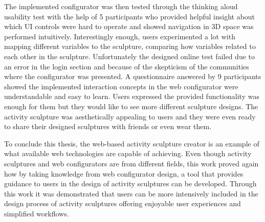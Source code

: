\documentclass[../medieninformatik-arbeit.tex]{subfiles}
\begin{document}
The implemented configurator was then tested through the thinking aloud usability test with the help of 5 participants who provided helpful insight about which UI controls were hard to operate and showed navigation in 3D space was performed intuitively. Interestingly enough, users experimented a lot with mapping different variables to the sculpture, comparing how variables related to each other in the sculpture. Unfortunately the designed online test failed due to an error in the login section and because of the skepticism of the communities where the configurator was presented. A questionnaire answered by 9 participants showed the implemented interaction concepts in the web configurator were understandable and easy to learn. Users expressed the provided functionality was enough for them but they would like to see more different sculpture designs. The activity sculpture was aesthetically appealing to users and they were even ready to share their designed sculptures with friends or even wear them. 

To conclude this thesis, the web-based activity sculpture creator is an example of what available web technologies are capable of achieving. Even though activity sculptures and web configurators are from different fields, this work proved again how by taking knowledge from web configurator design, a tool that provides guidance to users in the design of activity sculptures can be developed. Through this work it was demonstrated that users can be more intensively included in the design process of activity sculptures offering enjoyable user experiences and simplified workflows.
\end{document}

